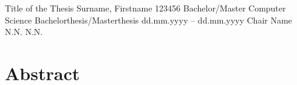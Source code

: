 





\sloppy

  \UDOTitle
      {Title of the Thesis}                         %
      {Surname, Firstname}                          %
      {123456}                                      %
      {Bachelor/Master Computer Science}            %
      {Bachelorthesis/Masterthesis}					%
      {dd.mm.yyyy -- dd.mm.yyyy}                    %
      {Chair Name}                           		%
      {N.N.}										%
      {N.N.}                                        %
  \clearpage



\setcounter{page}{1}

\chapter*{Abstract}

\lipsum[1-3]




\thispagestyle{referencelist}
\clearpage
{}

\tableofcontents
\thispagestyle{referencelist}
\clearpage

\setcounter{page}{3}

